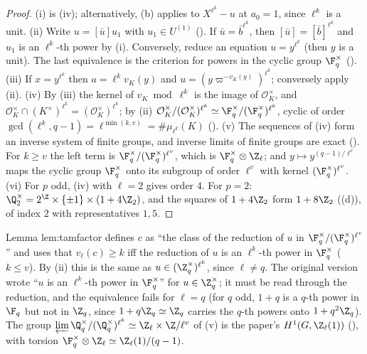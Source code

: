 \begin{proof}
(i) is (iv); alternatively, (b) applies to $X^{\ell^k}-u$ at $a_0=1$, since $\ell^k$ is a unit.
(ii) Write $u=[\bar u]u_1$ with $u_1\in U^{(1)}$ (). If $\bar u=\bar b^{\ell^k}$, then $[\bar u]=[\bar b]^{\ell^k}$ and $u_1$ is an
$\ell^k$-th power by (i). Conversely, reduce an equation $u=y^{\ell^k}$ (then $y$ is a unit). The last equivalence is the criterion for powers in the
cyclic group $\F_q^\times$ (). (iii) If $x=y^{\ell^k}$ then $a=\ell^kv_K(y)$ and $u=(y\varpi^{-v_K(y)})^{\ell^k}$; conversely apply (ii).
(iv) By (iii) the kernel of $v_K\bmod\ell^k$ is the image of $\mathcal O_K^\times$, and $\mathcal O_K^\times\cap(K^\times)^{\ell^k}=(\mathcal O_K^\times)^{\ell^k}$; by (ii)
$\mathcal O_K^\times/(\mathcal O_K^\times)^{\ell^k}\simeq\F_q^\times/(\F_q^\times)^{\ell^k}$, cyclic of order $\gcd(\ell^k,q-1)=\ell^{\min(k,v)}=\#\mu_{\ell^k}(K)$
(). (v) The sequences of (iv) form an inverse system of finite groups, and inverse limits of finite groups are exact
(). For $k\ge v$ the left term is $\F_q^\times/(\F_q^\times)^{\ell^v}$, which is $\F_q^\times\otimes\Z_\ell$; and $y\mapsto y^{(q-1)/\ell^v}$
maps the cyclic group $\F_q^\times$ onto its subgroup of order $\ell^v$ with kernel $(\F_q^\times)^{\ell^v}$. (vi) For $p$ odd, (iv) with $\ell=2$ gives
order $4$. For $p=2$: $\Q_2^\times=2^{\Z}\times\{\pm1\}\times(1+4\Z_2)$, and the squares of $1+4\Z_2$ form $1+8\Z_2$ ((d)),
of index $2$ with representatives $1,5$.
\end{proof}

\begin{paperlink}\label{pl:local:powers}
Lemma lem:tamfactor defines $c$ as ``the class of the reduction of $u$ in $\F_q^\times/(\F_q^\times)^{\ell^{v}}$'' and uses that $v_\ell(c)\ge k$ iff the
reduction of $u$ is an $\ell^k$-th power in $\F_q^\times$ ($k\le v$). By (ii) this is the same as $u\in(\Z_q^\times)^{\ell^k}$, since
$\ell\ne q$. The original version wrote ``$u$ is an $\ell^k$-th power in $\F_q^\times$'' for $u\in\Z_q^\times$; it must be read through the reduction, and
the equivalence fails for $\ell=q$ (for $q$ odd, $1+q$ is a $q$-th power in $\F_q$ but not in $\Z_q$, since $1+q\Z_q\simeq\Z_q$ carries the
$q$-th powers onto $1+q^2\Z_q$). The group $\varprojlim\Q_q^\times/(\Q_q^\times)^{\ell^k}\simeq\Z_\ell\times\Z/\ell^{v}$ of (v) is the paper's
$H^1(G,\Z_\ell(1))$ (), with torsion $\F_q^\times\otimes\Z_\ell\simeq\Z_\ell(1)/(q-1)$.
\end{paperlink}

